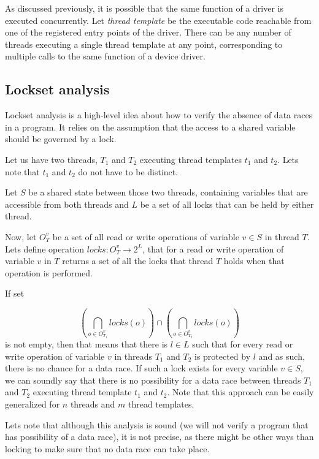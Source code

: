 \documentclass[..thesis.tex]{subfiles}
\begin{document}
As discussed previously, it is possible that the same function of a driver is executed concurrently. Let \textit{thread template}  be the executable code reachable from one of the registered entry points of the driver. There can be any number of threads executing a single thread template at any point, corresponding to multiple calls to the same function of a device driver.

\subsection{Lockset analysis}

Lockset analysis is a high-level idea about how to verify the absence of data races in a program. It relies on the assumption that the access to a shared variable should be governed by a lock. 

Let us have two threads, $T_1$ and $T_2$ executing thread templates $t_1$ and $t_2$. Lets note that $t_1$ and $t_2$ do not have to be distinct.

Let $S$ be a shared state between those two threads, containing variables that are accessible from both threads and $L$ be a set of all locks that can be held by either thread.

Now, let $O_{T}^v$ be a set of all read or write operations of variable $v \in S$ in thread $T$. Lets define operation $locks : O_{T}^v \to 2^L$, that for a read or write operation of variable $v$ in $T$ returns a set of all the locks that thread $T$ holds when that operation is performed.

If set

\begin{equation*}
\left( \bigcap \limits_{o \in O_{T_1}^v} locks \left(o \right) \right) \cap  \left( \bigcap \limits_{o \in O_{T_2}^v} locks \left(o \right) \right)
\end{equation*}
 is not empty, then that means that there is $l \in L$ such that for every read or write operation of variable $v$ in threads $T_1$ and $T_2$ is protected by $l$ and as such, there is no chance for a data race. If such a lock exists for every variable $v \in S$, we can soundly say that there is no possibility for a data race between threads $T_1$ and $T_2$ executing thread template $t_1$ and $t_2$. Note that this approach can be easily generalized for $n$ threads and $m$ thread templates.

Lets note that although this analysis is sound (we will not verify a program that has possibility of a data race), it is not precise, as there might be other ways than locking to make sure that no data race can take place.
\end{document}
